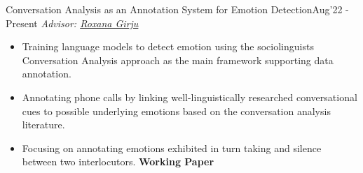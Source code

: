 \begin{projects}

\project
    {Conversation Analysis as an Annotation System for Emotion Detection}{Aug'22 - Present}
	{ \textit{Advisor: \href{https://linguistics.illinois.edu/directory/profile/girju}{Roxana Girju}}}
	{
	\begin{itemize}
	\setlength\itemsep{0.3em}
     \item Training language models to detect emotion using the sociolinguists Conversation Analysis approach as the main framework supporting data annotation.
     \item Annotating phone calls by linking well-linguistically researched conversational cues to possible underlying emotions based on the conversation analysis literature.   %
     \item Focusing on annotating emotions exhibited in turn taking and silence between two interlocutors. {\small{\lbrack\textbf{{Working Paper}}\rbrack} }
     \end{itemize}
     }
     

\end{projects}
